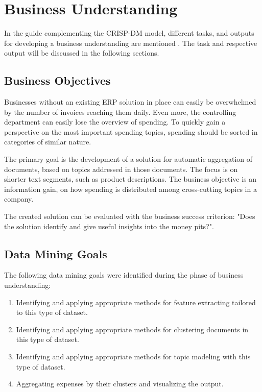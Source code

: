 \chapter{Business Understanding}
In the guide complementing the \ac{CRISP-DM} model, different tasks, and outputs for developing a business understanding are mentioned \cite{CRISPDM2000}. The task and respective output will be discussed in the following sections.

\section{Business Objectives}
\label{section:business-objectives}
Businesses without an existing \ac{ERP} solution in place can easily be overwhelmed by the number of invoices reaching them daily. Even more, the controlling department can easily lose the overview of spending. To quickly gain a perspective on the most important spending topics, spending should be sorted in categories of similar nature.

The primary goal is the development of a solution for automatic aggregation of documents, based on topics addressed in those documents. The focus is on shorter text segments, such as product descriptions. The business objective is an information gain, on how spending is distributed among cross-cutting topics in a company.

The created solution can be evaluated with the business success criterion: "Does the solution identify and give useful insights into the money pits?".

\section{Data Mining Goals}
\label{section:data-mining-goals}
The following data mining goals were identified during the phase of business understanding:

\begin{enumerate}
	\item Identifying and applying appropriate methods for feature extracting tailored to this type of dataset.
	\item Identifying and applying appropriate methods for clustering documents in this type of dataset.
	\item Identifying and applying appropriate methods for topic modeling with this type of dataset.
	\item Aggregating expenses by their clusters and visualizing the output.
\end{enumerate}

